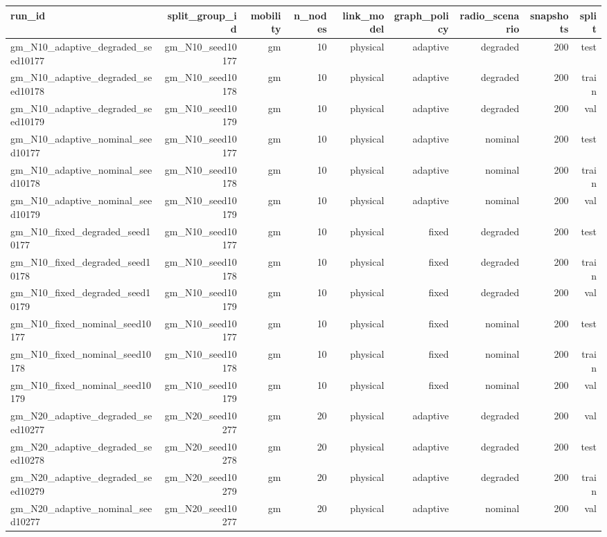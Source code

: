 \begin{tabular}{lrrrrrrrr}
\toprule
run\_id & split\_group\_id & mobility & n\_nodes & link\_model & graph\_policy & radio\_scenario & snapshots & split \\
\midrule
gm\_N10\_adaptive\_degraded\_seed10177 & gm\_N10\_seed10177 & gm & 10 & physical & adaptive & degraded & 200 & test \\
gm\_N10\_adaptive\_degraded\_seed10178 & gm\_N10\_seed10178 & gm & 10 & physical & adaptive & degraded & 200 & train \\
gm\_N10\_adaptive\_degraded\_seed10179 & gm\_N10\_seed10179 & gm & 10 & physical & adaptive & degraded & 200 & val \\
gm\_N10\_adaptive\_nominal\_seed10177 & gm\_N10\_seed10177 & gm & 10 & physical & adaptive & nominal & 200 & test \\
gm\_N10\_adaptive\_nominal\_seed10178 & gm\_N10\_seed10178 & gm & 10 & physical & adaptive & nominal & 200 & train \\
gm\_N10\_adaptive\_nominal\_seed10179 & gm\_N10\_seed10179 & gm & 10 & physical & adaptive & nominal & 200 & val \\
gm\_N10\_fixed\_degraded\_seed10177 & gm\_N10\_seed10177 & gm & 10 & physical & fixed & degraded & 200 & test \\
gm\_N10\_fixed\_degraded\_seed10178 & gm\_N10\_seed10178 & gm & 10 & physical & fixed & degraded & 200 & train \\
gm\_N10\_fixed\_degraded\_seed10179 & gm\_N10\_seed10179 & gm & 10 & physical & fixed & degraded & 200 & val \\
gm\_N10\_fixed\_nominal\_seed10177 & gm\_N10\_seed10177 & gm & 10 & physical & fixed & nominal & 200 & test \\
gm\_N10\_fixed\_nominal\_seed10178 & gm\_N10\_seed10178 & gm & 10 & physical & fixed & nominal & 200 & train \\
gm\_N10\_fixed\_nominal\_seed10179 & gm\_N10\_seed10179 & gm & 10 & physical & fixed & nominal & 200 & val \\
gm\_N20\_adaptive\_degraded\_seed10277 & gm\_N20\_seed10277 & gm & 20 & physical & adaptive & degraded & 200 & val \\
gm\_N20\_adaptive\_degraded\_seed10278 & gm\_N20\_seed10278 & gm & 20 & physical & adaptive & degraded & 200 & test \\
gm\_N20\_adaptive\_degraded\_seed10279 & gm\_N20\_seed10279 & gm & 20 & physical & adaptive & degraded & 200 & train \\
gm\_N20\_adaptive\_nominal\_seed10277 & gm\_N20\_seed10277 & gm & 20 & physical & adaptive & nominal & 200 & val \\

\end{tabular}
